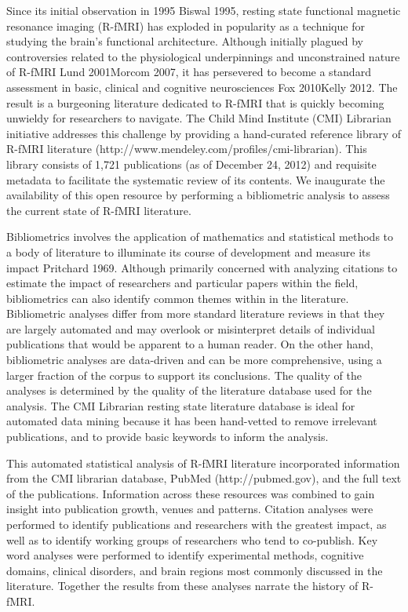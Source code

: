\documentclass[12pt,3p]{elsarticle}
\begin{document}
Since its initial observation in 1995 {Biswal 1995}, resting state functional
magnetic resonance imaging (R-fMRI) has exploded in popularity as a technique
for studying the brain’s functional architecture. Although initially plagued by
	controversies related to the physiological underpinnings and
	unconstrained nature of R-fMRI {Lund 2001}{Morcom 2007}, it has
	persevered to become a standard assessment in basic, clinical and
	cognitive neurosciences {Fox 2010}{Kelly 2012}.  The result is a
	burgeoning literature dedicated to R-fMRI that is quickly becoming
	unwieldy for researchers to navigate. The Child Mind Institute (CMI)
	Librarian initiative addresses this challenge by providing a
	hand-curated reference library of R-fMRI literature
	(http://www.mendeley.com/profiles/cmi-librarian). This library consists
	of 1,721 publications (as of December 24, 2012) and requisite metadata
	to facilitate the systematic review of its contents. We inaugurate the
	availability of this open resource by performing a bibliometric analysis
	to assess the current state of R-fMRI literature.

Bibliometrics involves the application of mathematics and statistical methods to
a body of literature to illuminate its course of development and measure its
impact {Pritchard 1969}. Although primarily concerned with analyzing citations
to estimate the impact of researchers and particular papers within the field,
bibliometrics can also identify common themes within in the literature.
Bibliometric analyses differ from more standard literature reviews in that they
are largely automated and may overlook or misinterpret details of individual
publications that would be apparent to a human reader. On the other hand,
bibliometric analyses are data-driven and can be more comprehensive, using a
larger fraction of the corpus to support its conclusions. The quality of the
analyses is determined by the quality of the literature database used for the
analysis. The CMI Librarian resting state literature database is ideal for
automated data mining because it has been hand-vetted to remove irrelevant
publications, and to provide basic keywords to inform the analysis.

This automated statistical analysis of R-fMRI literature incorporated
information from the CMI librarian database, PubMed (http://pubmed.gov), and the
full text of the publications. Information across these resources was combined
to gain insight into publication growth, venues and patterns. Citation analyses
were performed to identify publications and researchers with the greatest
impact, as well as to identify working groups of researchers who tend to
co-publish. Key word analyses were performed to identify experimental methods,
cognitive domains, clinical disorders, and brain regions most commonly discussed
in the literature. Together the results from these analyses narrate the history
of R-fMRI.
\end{document}
